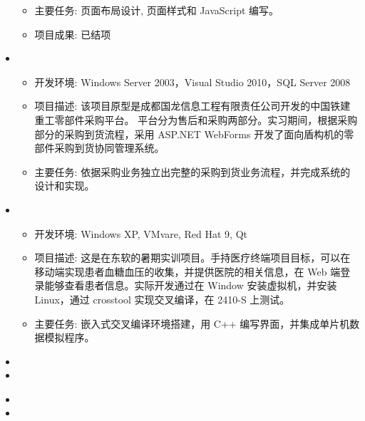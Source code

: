 \documentclass[letterpaper,11pt]{article}
\begin{document}
\begin{itemize}[leftmargin=*]
{\begin{itemize}
      \item 主要任务: 页面布局设计, 页面样式和 JavaScript 编写。
      \item 项目成果: 已结项
    \end{itemize}
    }
    \item
    {\footnotesize
    \begin{itemize}
      \item 开发环境: Windows Server 2003，Visual Studio 2010，SQL Server 2008
      \item 项目描述: 该项目原型是成都国龙信息工程有限责任公司开发的中国铁建重工零部件采购平台。 平台分为售后和采购两部分。实习期间，根据采购部分的采购到货流程，采用 ASP.NET WebForms 开发了面向盾构机的零部件采购到货协同管理系统。
      \item 主要任务: 依据采购业务独立出完整的采购到货业务流程，并完成系统的设计和实现。
    \end{itemize}
    }
    \item {}
    {\footnotesize
    \begin{itemize}
      \item 开发环境: Windows XP, VMvare, Red Hat 9, Qt
      \item 项目描述: 这是在东软的暑期实训项目。手持医疗终端项目目标，可以在移动端实现患者血糖血压的收集，并提供医院的相关信息，在 Web 端登录能够查看患者信息。实际开发通过在 Window 安装虚拟机，并安装 Linux，通过 crosstool 实现交叉编译，在 2410-S 上测试。
      \item 主要任务: 嵌入式交叉编译环境搭建，用 C++ 编写界面，并集成单片机数据模拟程序。
    \end{itemize}
    }
  \end{itemize}

  \begin{itemize}[leftmargin=*]
    \item
    \item
  \end{itemize}

  \begin{itemize}[leftmargin=*]
    \item
    \item
  \end{itemize}
\end{document}
